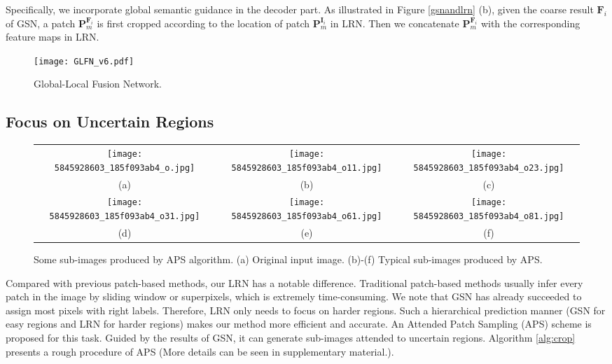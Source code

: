 \documentclass[10pt,twocolumn,letterpaper]{article}
\begin{document}
Specifically, we incorporate global semantic guidance
in the decoder part. As illustrated in Figure \ref{gsnandlrn} (b), given the coarse result $\bm{F}_i$ of GSN, a patch $\bm{P}_m^{\bm{F}_i}$ is first cropped according to the location of
patch $\bm{P}_m^{\bm{I}_i}$ in LRN. Then we concatenate $\bm{P}_m^{\bm{F}_i}$ with the corresponding feature maps in LRN.
\begin{figure*}[!t]
  \vspace{-3mm}
  \centering
\texttt{[image: GLFN\_v6.pdf]}\\
  \caption{Global-Local Fusion Network.}\label{glfn}
  \vspace{-4mm}
\end{figure*}
\subsection{Focus on Uncertain Regions}
\begin{figure}[h]
    \centering
     \renewcommand{\arraystretch}{0.5}
        \begin{tabular}{ccc}
            \texttt{[image: 5845928603\_185f093ab4\_o.jpg]}&
            \texttt{[image: 5845928603\_185f093ab4\_o11.jpg]}&
            \texttt{[image: 5845928603\_185f093ab4\_o23.jpg]}\\
            (a) &(b) &(c)\\
            \texttt{[image: 5845928603\_185f093ab4\_o31.jpg]}&
            \texttt{[image: 5845928603\_185f093ab4\_o61.jpg]}&
            \texttt{[image: 5845928603\_185f093ab4\_o81.jpg]}\\
            (d) &(e) &(f)\\
        \end{tabular}
        \vspace{0.8mm}
    \caption{Some sub-images produced by APS algorithm. (a) Original input image. (b)-(f) Typical sub-images produced by APS.}
 \vspace{-2mm}
    \label{fig:patch}
    \end{figure}
Compared with previous patch-based methods, our LRN has a notable difference. Traditional patch-based methods usually infer every patch in the image by sliding window or superpixels, which is extremely time-consuming. We note that GSN has already succeeded to assign most pixels with right labels. Therefore, LRN only needs to focus on harder regions. Such a hierarchical prediction manner (GSN for easy regions and LRN for harder regions) makes our method more efficient and accurate. An Attended Patch Sampling (APS) scheme is proposed for this task. Guided by the results of GSN, it can generate sub-images attended to uncertain regions. Algorithm \ref{alg:crop} presents a rough procedure of APS (More details can be seen in supplementary material.).
\end{document}
